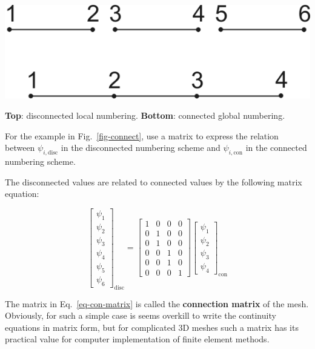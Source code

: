 \begin{marginfigure}
\centering
\includegraphics{numeric/figures/connect}
\caption{\textbf{Top}: disconnected local numbering. \textbf{Bottom}: connected global numbering.}
\label{fig-connect}
\end{marginfigure}

\begin{cue}
For the example in Fig.~\ref{fig-connect}, use a matrix to express the relation between $\psi_{i, \mathrm{disc}}$ in the disconnected numbering scheme and  $\psi_{i, \mathrm{con}}$ in the connected numbering scheme.
\end{cue}
  
The disconnected values are related to connected values by the following matrix equation:

\begin{equation}
\begin{bmatrix}
\psi_1 \\ \psi_2 \\ \psi_3 \\ \psi_4 \\ \psi_5 \\ \psi_6
\end{bmatrix}_{\mathrm{disc}}
=
\begin{bmatrix}
1 & 0 & 0 & 0  \\ 
0 & 1 & 0 & 0  \\   
0 & 1 & 0 & 0  \\ 
0 & 0 & 1 & 0  \\   
0 & 0 & 1 & 0  \\  
0 & 0 & 0 & 1  
\end{bmatrix}
\begin{bmatrix}
\psi_1 \\ \psi_2 \\ \psi_3 \\ \psi_4
\end{bmatrix}_{\mathrm{con}}
\label{eq-con-matrix}
\end{equation} 

The matrix in Eq.~\ref{eq-con-matrix} is called the \textbf{connection matrix} of the mesh. Obviously, for such a simple case is seems overkill to write the continuity equations in matrix form, but for complicated 3D meshes such a matrix has its practical value for computer implementation of finite element methods.

